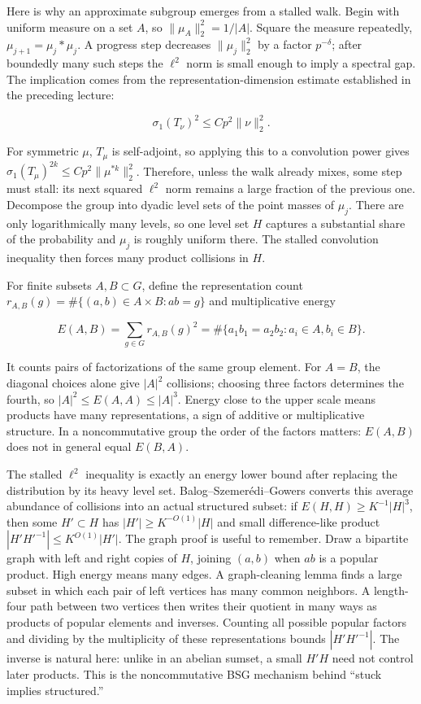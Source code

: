 Here is why an approximate subgroup emerges from a stalled walk. Begin with uniform measure on a set \(A\), so \(\|\mu_A\|_2^2=1/|A|\). Square the measure repeatedly, \(\mu_{j+1}=\mu_j*\mu_j\). A progress step decreases \(\|\mu_j\|_2^2\) by a factor \(p^{-\delta}\); after boundedly many such steps the \(\ell^2\) norm is small enough to imply a spectral gap. The implication comes from the representation-dimension estimate established in the preceding lecture:

\[ \sigma_1(T_\nu)^2\leq C p^2\|\nu\|_2^2. \]

For symmetric \(\mu\), \(T_\mu\) is self-adjoint, so applying this to a convolution power gives \(\sigma_1(T_\mu)^{2k}\leq C p^2\|\mu^{*k}\|_2^2\). Therefore, unless the walk already mixes, some step must stall: its next squared \(\ell^2\) norm remains a large fraction of the previous one. Decompose the group into dyadic level sets of the point masses of \(\mu_j\). There are only logarithmically many levels, so one level set \(H\) captures a substantial share of the probability and \(\mu_j\) is roughly uniform there. The stalled convolution inequality then forces many product collisions in \(H\).

For finite subsets \(A,B\subset G\), define the representation count \(r_{A,B}(g)=\#\{(a,b)\in A\times B:ab=g\}\) and multiplicative energy

\[ E(A,B)=\sum_{g\in G}r_{A,B}(g)^2=\#\{a_1b_1=a_2b_2:a_i\in A,b_i\in B\}. \]

It counts pairs of factorizations of the same group element. For \(A=B\), the diagonal choices alone give \(|A|^2\) collisions; choosing three factors determines the fourth, so \(|A|^2\leq E(A,A)\leq|A|^3\). Energy close to the upper scale means products have many representations, a sign of additive or multiplicative structure. In a noncommutative group the order of the factors matters: \(E(A,B)\) does not in general equal \(E(B,A)\).

The stalled \(\ell^2\) inequality is exactly an energy lower bound after replacing the distribution by its heavy level set. Balog--Szemerédi--Gowers converts this average abundance of collisions into an actual structured subset: if \(E(H,H)\geq K^{-1}|H|^3\), then some \(H'\subset H\) has \(|H'|\geq K^{-O(1)}|H|\) and small difference-like product \(|H'H'^{-1}|\leq K^{O(1)}|H'|\). The graph proof is useful to remember. Draw a bipartite graph with left and right copies of \(H\), joining \((a,b)\) when \(ab\) is a popular product. High energy means many edges. A graph-cleaning lemma finds a large subset in which each pair of left vertices has many common neighbors. A length-four path between two vertices then writes their quotient in many ways as products of popular elements and inverses. Counting all possible popular factors and dividing by the multiplicity of these representations bounds \(|H'H'^{-1}|\). The inverse is natural here: unlike in an abelian sumset, a small \(H'H\) need not control later products. This is the noncommutative BSG mechanism behind ``stuck implies structured.''

